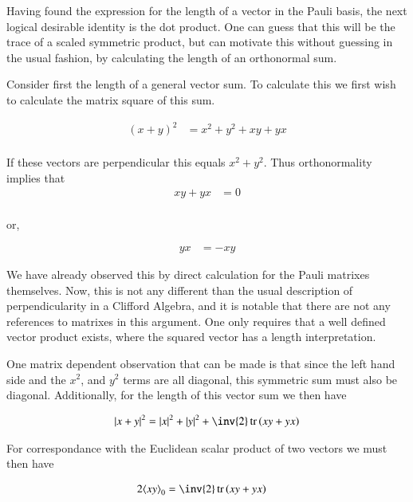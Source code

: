 \documentclass{article}
\DeclareMathOperator{\tr}{tr}
\newcommand{\traceB}[1]{\tr\left({#1}\right)}
\begin{document}
Having found the expression for the length of a vector in the Pauli basis, the next logical desirable identity is the dot product.  One can guess that
this will be the trace of a scaled symmetric product, but can motivate this without guessing in the usual fashion, by calculating the length of an 
orthonormal sum.

Consider first the length of a general vector sum.  To calculate this we first wish to calculate the matrix square of this sum.

\begin{align*}
(x + y)^2 &= x^2 + y^2 + x y + y x \\
\end{align*}

If these vectors are perpendicular this equals $x^2 + y^2$.  Thus orthonormality implies that
\begin{align*}
x y + y x &= 0 \\
\end{align*}

or,

\begin{align}
y x &= - x y
\end{align}

We have already observed this by direct calculation for the Pauli matrixes themselves.  Now, this is not any different than the usual description of perpendicularity in a Clifford Algebra, and it is notable that there are not any references to matrixes in this argument.  One only requires that a well defined vector
product exists, where the squared vector has a length interpretation.

One matrix dependent observation that can be made is that since the left hand side and the $x^2$, and $y^2$ terms are all diagonal, this symmetric sum must also be diagonal.  Additionally, for the length of this vector sum we then have

\begin{align*}
{\Abs{x + y}}^2
&= \Abs{x}^2 + \Abs{y}^2 + \inv{2}\traceB{x y + y x} \\
\end{align*}

For correspondance with the Euclidean scalar product of two vectors we must then have

\begin{align*}
2 \gpgradezero{x y} &= \inv{2}\traceB{x y + y x}
\end{align*}
\end{document}

